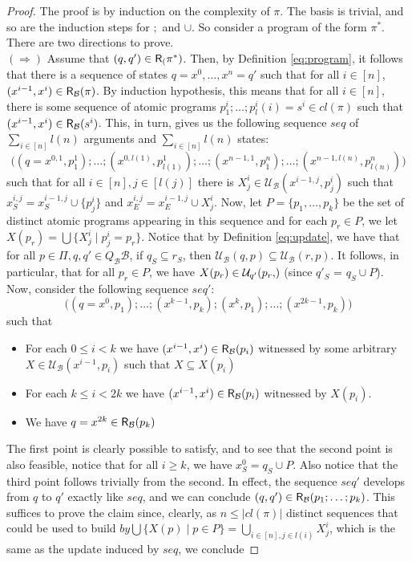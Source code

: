 \documentclass{llncs}
\newcommand{\cl}{cl}
\newcommand{\rels}[1]{{\sf R_{#1}}}
\newcommand{\update}[3]{{\mathcal U}_{#1}(#2,#3)}
\newcommand{\views}{\mathcal B}
\newcommand{\carrier}{Q_\views}
\begin{document}
\begin{proof}
The proof is by induction on the complexity of $\pi$. The basis is trivial, and so are the induction steps for $;$ and $\cup$. So consider a program of the form $\pi^\ast$. There are two directions to prove. \\
$(\Rightarrow)$ Assume that $(q,q') \in \rels(\pi^\ast)$. Then, by Definition \ref{eq:program}, it follows that there is a sequence of states $q = x^0,\ldots,x^n = q'$ such that for all $i \in [n]$, $(x^{i-1},x^i) \in \rels \views(\pi)$. By induction hypothesis, this means that for all $i \in [n]$, there is some sequence of atomic programs $p^i_1;\ldots;p^i_l(i) = s^i \in \cl(\pi)$ such that $(x^{i-1},x^i) \in \rels \views(s^i)$. This, in turn, gives us the following sequence $seq$ of $\sum_{i \in [n]}l(n)$ arguments and $\sum_{i \in [n]}l(n)$ states:
$$
\big((q=x^{0,1},p^1_1);\ldots;(x^{0,l(1)},p^1_{l(1)});\ldots;(x^{n-1,1},p^n_1);\ldots;(x^{n-1,l(n)},p^n_{l(n)})\big)$$
such that for all $i \in [n], j \in [l(j)]$ there is $X^i_j \in \update \views {x^{i-1,j}} {p^i_j}$ such that $x^{i,j}_S = x^{i-1,j}_S \cup \{p^i_j\}$ and $x^{i,j}_E = x^{i-1,j}_E \cup X^i_j$. Now, let $P = \{p_1,\ldots,p_k\}$ be the set of distinct atomic programs appearing in this sequence and for each $p_r \in P$, we let $X(p_r) = \bigcup\{X^i_j \mid p^i_j =p_r\}$. Notice that by Definition \ref{eq:update}, we have that for all $p \in \Pi, q, q' \in \carrier \views$, if $q_S \subseteq r_S$, then $\update \views q p \subseteq \update \views r p$. It follows, in particular, that for all $p_r \in P$, we have $X(p_r) \in \update {q'} {p_r}$ (since $q'_S$ = $q_S \cup P$). Now, consider the following sequence $seq'$:
$$
\big((q = x^0,p_1);\ldots;(x^{k-1},p_k);(x^{k},p_1);\ldots;(x^{2k-1},p_k)\big)$$
such that 
\begin{itemize}
\item For each $0 \leq i < k$ we have $(x^{i-1},x^i) \in \rels \views(p_i)$ witnessed by some arbitrary $X \in \update \views {x^{i-1}} {p_i}$ such that $X \subseteq X(p_i)$
\item For each $k \leq i < 2k$ we have $(x^{i-1},x^i) \in \rels \views(p_i)$ witnessed by $X(p_i)$.
\item We have $q= x^{2k} \in \rels \views(p_k)$
\end{itemize}
The first point is clearly possible to satisfy, and to see that the second point is also feasible, notice that for all $i \geq k$, we have $x^0_S = q_S \cup P$. Also notice that the third point follows trivially from the second. 
In effect, the sequence $seq'$ develops from $q$ to $q'$ exactly like $seq$, and we can conclude $(q,q') \in \rels \views(p_1;\ldots;p_k)$. This suffices to prove the claim since, clearly, as $n \leq |\cl(\pi)|$ distinct sequences that could be used to build $
by \bigcup\{X(p) \mid p \in P\} = \bigcup_{i \in [n],j \in l(i)}X^i_j$, which is the same as the update induced by $seq$, we conclude 

\end{proof}
\end{document}
